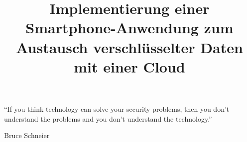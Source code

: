 \documentclass[10pt, a4paper]{scrreprt}
\begin{document}
\pagestyle{empty}



\begin{titlepage}
\title{Implementierung einer Smartphone-Anwendung zum Austausch verschlüsselter Daten mit einer Cloud}
\maketitle
\end{titlepage}

\vspace*{\fill}
\begin{center}
“If you think technology can solve your security problems, then you don’t understand the problems and you don’t understand the technology.”
\end{center}
\begin{flushright}
Bruce Schneier
\end{flushright}
\vspace*{\fill}

\clearpage%
\begingroup
  \renewcommand*{\chapterpagestyle}{empty}
  \pagestyle{empty}
  \tableofcontents
  \clearpage
\endgroup

\end{document}
